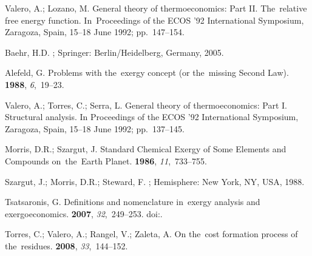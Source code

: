 \documentclass[energies,article,accept,moreauthors,pdftex]{Definitions/mdpi}
\begin{document}
\begin{thebibliography}{999}
	

	
	Valero, A.; Lozano, M.
	\newblock General theory of thermoeconomics: Part II. The~relative free energy
	function.
	\newblock  In~Proceedings of the ECOS '92 International Symposium, Zaragoza, Spain, 15--18 June 1992; pp.~147--154. 
	
	Baehr, H.D.
	; Springer: Berlin/Heidelberg, Germany, 2005.

	
	Alefeld, G.
	\newblock Problems with the~exergy concept (or the~missing {S}econd {L}aw).
	 {\bf 1988}, {\em 6},~19--23.

	
	Valero, A.; Torres, C.; Serra, L.
	\newblock General theory of thermoeconomics: Part I. Structural analysis.
	\newblock  In Proceedings of the ECOS '92 International Symposium, Zaragoza, Spain, 15--18 June 1992; pp.~137--145.

	
	Morris, D.R.; Szargut, J.
	\newblock Standard Chemical Exergy of Some Elements and Compounds on~the~Earth
	Planet.
	 {\bf 1986}, {\em 11},~733--755.

	
	Szargut, J.; Morris, D.R.; Steward, F.
	; Hemisphere: New York, NY, USA, 1988.

	
	Tsatsaronis, G.
	\newblock Definitions and nomenclature in~exergy analysis and exergoeconomics.
	 {\bf 2007}, {\em 32},~249--253.
	doi:{\href{https://doi.org/https://doi.org/10.1016/j.energy.2006.07.002}{}}. 
	
	
	Torres, C.; Valero, A.; Rangel, V.; Zaleta, A.
	\newblock On the~cost formation process of the~residues.
	 {\bf 2008}, {\em 33},~144--152.
	

\end{thebibliography}
\end{document}
